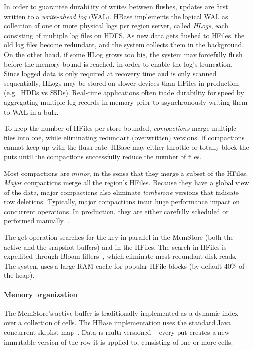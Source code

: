 In order to guarantee durability of writes between flushes, updates are first written to 
a \emph{write-ahead log} (WAL). HBase implements the logical WAL as collection of one or more physical 
logs per region server, called \emph{HLogs}, each consisting of multiple log files on HDFS. 
As new data gets flushed to HFiles, the old log files become redundant, and the system collects 
them in the background. On the other hand, if some HLog grows too big, the system may forcefully
flush before the memory bound is reached, in order to enable the log's truncation. 
Since logged data is only required at recovery time and is only scanned sequentially, HLogs
may be stored on slower devices than HFiles in production (e.g., HDDs vs SSDs). 
Real-time applications often trade durability for speed by aggregating multiple log records 
in memory prior to asynchronously writing them to WAL in a bulk. 

To keep the number of HFiles per store bounded, \emph{compactions} merge multiple files 
into one, while eliminating redundant (overwritten) versions. If compactions cannot keep up
with the flush rate, HBase may either throttle or totally block the puts until the compactions 
successfully reduce the number of files. 

Most compactions are \emph{minor}, 
in the sense that they merge a subset of the HFiles. \emph{Major} compactions merge all the region's 
HFiles. Because they have a global view of the data, major compactions also eliminate 
{\em tombstone} versions that indicate row deletions. Typically, major compactions incur huge 
performance impact on concurrent operations. In production, they are either carefully scheduled 
or performed manually~\cite{hbasetuning}.

The get operation searches for the key in parallel in the MemStore (both the active and the 
snapshot buffers) and in the HFiles. The search in HFiles is expedited through Bloom 
filters~\cite{Chang2008}, which eliminate most redundant disk reads. The system 
uses a large RAM cache for popular HFile blocks (by default $40\%$ of the heap).

\paragraph{Memory organization}
The MemStore's active buffer is traditionally implemented as a dynamic index over a collection of cells.  
The HBase implementation uses the standard Java concurrent skiplist map~\cite{javaskiplist}.
Data is multi-versioned -- every put creates a new immutable version of the row it is applied to, 
consisting of one or more cells. 

